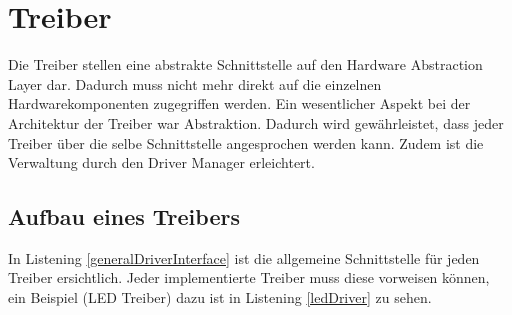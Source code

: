 \section{Treiber}
Die Treiber stellen eine abstrakte Schnittstelle auf den Hardware Abstraction Layer dar. Dadurch muss nicht mehr direkt auf die einzelnen Hardwarekomponenten zugegriffen werden. Ein wesentlicher Aspekt bei der Architektur der Treiber war Abstraktion. Dadurch wird gewährleistet, dass jeder Treiber über die selbe Schnittstelle angesprochen werden kann. Zudem ist die Verwaltung durch den Driver Manager erleichtert.

\subsection{Aufbau eines Treibers}
In Listening \ref{generalDriverInterface} ist die allgemeine Schnittstelle für jeden Treiber ersichtlich. Jeder implementierte Treiber muss diese vorweisen können, ein Beispiel (LED Treiber) dazu ist in Listening \ref{ledDriver} zu sehen.






\pagebreak 